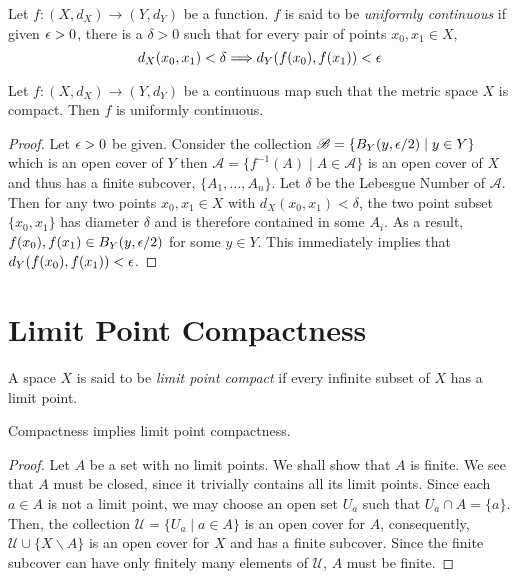 \begin{definition}
    Let $f:(X, d_X)\to (Y,d_Y)$ be a function. $f$ is said to be \textit{uniformly continuous} if given $\epsilon > 0$, there is a $\delta > 0$ such that for every pair of points $x_0, x_1\in X$,
    \begin{equation*}
        d_X(x_0, x_1) < \delta\Longrightarrow d_Y(f(x_0), f(x_1)) < \epsilon
    \end{equation*}
\end{definition}

\begin{theorem}
    Let $f:(X, d_X)\to (Y, d_Y)$ be a continuous map such that the metric space $X$ is compact. Then $f$ is uniformly continuous.
\end{theorem}
\begin{proof}
    Let $\epsilon > 0$ be given. Consider the collection $\mathscr{B} = \{B_Y(y,\epsilon/2)\mid y\in Y\}$ which is an open cover of $Y$ then $\mathscr{A} = \{f^{-1}(A)\mid A\in\mathscr{A}\}$ is an open cover of $X$ and thus has a finite subcover, $\{A_1,\ldots,A_n\}$. Let $\delta$ be the Lebesgue Number of $\mathscr{A}$. Then for any two points $x_0, x_1\in X$ with $d_X(x_0, x_1) < \delta$, the two point subset $\{x_0, x_1\}$ has diameter $\delta$ and is therefore contained in some $A_i$. As a result, $f(x_0), f(x_1)\in B_Y(y,\epsilon/2)$ for some $y\in Y$. This immediately implies that $d_Y(f(x_0), f(x_1)) < \epsilon$.
\end{proof}

\section{Limit Point Compactness}
\begin{definition}
    A space $X$ is said to be \textit{limit point compact} if every infinite subset of $X$ has a limit point.
\end{definition}

\begin{theorem}
    Compactness implies limit point compactness.
\end{theorem}
\begin{proof}
    Let $A$ be a set with no limit points. We shall show that $A$ is finite. We see that $A$ must be closed, since it trivially contains all its limit points. Since each $a\in A$ is not a limit point, we may choose an open set $U_a$ such that $U_a\cap A = \{a\}$. Then, the collection $\mathscr{U} = \{U_a\mid a\in A\}$ is an open cover for $A$, consequently, $\mathscr{U}\cup\{X\backslash A\}$ is an open cover for $X$ and has a finite subcover. Since the finite subcover can have only finitely many elements of $\mathscr{U}$, $A$ must be finite.
\end{proof}

